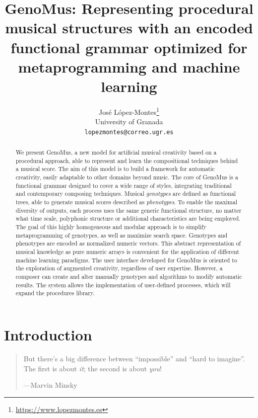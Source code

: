 \documentclass{article}
\title{GenoMus: Representing procedural musical structures with an encoded functional grammar optimized for metaprogramming and machine learning}
\author{
  Jos\'e L\'opez-Montes\thanks{\url{https://www.lopezmontes.es}} \\
  University of Granada\\
  \texttt{lopezmontes@correo.ugr.es} \\
}
\begin{document}
\maketitle

\begin{abstract}

 	
We present GenoMus, a new model for artificial musical creativity based on a procedural approach, able to represent and learn the compositional techniques behind a musical score. The aim of this model is to build a framework for automatic creativity, easily adaptable to other domains beyond music. The core of GenoMus is a functional grammar designed to cover a wide range of styles, integrating traditional and contemporary composing techniques. Musical \emph{genotypes} are defined as functional trees, able to generate musical scores described as \emph{phenotypes}. To enable the maximal diversity of outputs, each process uses the same generic functional structure, no matter what time scale, polyphonic structure or additional characteristics are being employed. The goal of this highly homogeneous and modular approach is to simplify metaprogramming of genotypes, as well as maximize search space. Genotypes and phenotypes are encoded as normalized numeric vectors. This abstract representation of musical knowledge as pure numeric arrays is convenient for the application of different machine learning paradigms. The user interface developed for GenoMus is oriented to the exploration of augmented creativity, regardless of user expertise. However, a composer can create and alter manually genotypes and algorithms to modify automatic results. The system allows the implementation of user-defined processes, which will expand the procedures library. 

\end{abstract}




\setcounter{tocdepth}{2}
\tableofcontents
\bigskip



\section{Introduction}

\begin{samepage}
\begin{quotation}
But there's a big difference between ``impossible'' and ``hard to imagine''. The first is about \emph{it}; the second is about \emph{you}!

---Marvin Minsky \cite{DBLP:journals/aim/Minsky82}
\end{quotation}
\end{samepage}
\end{document}
